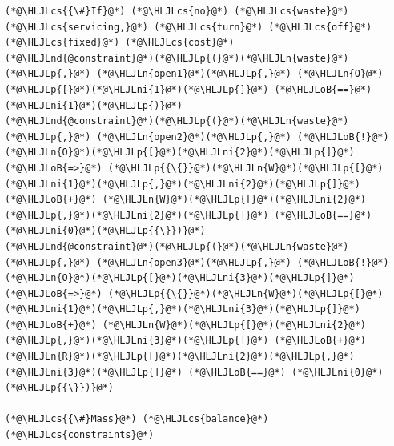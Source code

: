 \documentclass[12pt,a4paper]{article}
\newcommand{\HLJLn}[1]{#1}
\newcommand{\HLJLnd}[1]{\textcolor[RGB]{214,102,97}{#1}}
\newcommand{\HLJLni}[1]{\textcolor[RGB]{59,151,46}{#1}}
\newcommand{\HLJLoB}[1]{\textcolor[RGB]{102,102,102}{\textbf{#1}}}
\newcommand{\HLJLp}[1]{#1}
\newcommand{\HLJLcs}[1]{\textcolor[RGB]{153,153,119}{\textit{#1}}}
\begin{document}
\begin{lstlisting}
(*@\HLJLcs{{\#}If}@*) (*@\HLJLcs{no}@*) (*@\HLJLcs{waste}@*) (*@\HLJLcs{servicing,}@*) (*@\HLJLcs{turn}@*) (*@\HLJLcs{off}@*) (*@\HLJLcs{fixed}@*) (*@\HLJLcs{cost}@*)
(*@\HLJLnd{@constraint}@*)(*@\HLJLp{(}@*)(*@\HLJLn{waste}@*)(*@\HLJLp{,}@*) (*@\HLJLn{open1}@*)(*@\HLJLp{,}@*) (*@\HLJLn{O}@*)(*@\HLJLp{[}@*)(*@\HLJLni{1}@*)(*@\HLJLp{]}@*) (*@\HLJLoB{==}@*) (*@\HLJLni{1}@*)(*@\HLJLp{)}@*)
(*@\HLJLnd{@constraint}@*)(*@\HLJLp{(}@*)(*@\HLJLn{waste}@*)(*@\HLJLp{,}@*) (*@\HLJLn{open2}@*)(*@\HLJLp{,}@*) (*@\HLJLoB{!}@*)(*@\HLJLn{O}@*)(*@\HLJLp{[}@*)(*@\HLJLni{2}@*)(*@\HLJLp{]}@*) (*@\HLJLoB{=>}@*) (*@\HLJLp{{\{}}@*)(*@\HLJLn{W}@*)(*@\HLJLp{[}@*)(*@\HLJLni{1}@*)(*@\HLJLp{,}@*)(*@\HLJLni{2}@*)(*@\HLJLp{]}@*) (*@\HLJLoB{+}@*) (*@\HLJLn{W}@*)(*@\HLJLp{[}@*)(*@\HLJLni{2}@*)(*@\HLJLp{,}@*)(*@\HLJLni{2}@*)(*@\HLJLp{]}@*) (*@\HLJLoB{==}@*) (*@\HLJLni{0}@*)(*@\HLJLp{{\}})}@*)
(*@\HLJLnd{@constraint}@*)(*@\HLJLp{(}@*)(*@\HLJLn{waste}@*)(*@\HLJLp{,}@*) (*@\HLJLn{open3}@*)(*@\HLJLp{,}@*) (*@\HLJLoB{!}@*)(*@\HLJLn{O}@*)(*@\HLJLp{[}@*)(*@\HLJLni{3}@*)(*@\HLJLp{]}@*) (*@\HLJLoB{=>}@*) (*@\HLJLp{{\{}}@*)(*@\HLJLn{W}@*)(*@\HLJLp{[}@*)(*@\HLJLni{1}@*)(*@\HLJLp{,}@*)(*@\HLJLni{3}@*)(*@\HLJLp{]}@*) (*@\HLJLoB{+}@*) (*@\HLJLn{W}@*)(*@\HLJLp{[}@*)(*@\HLJLni{2}@*)(*@\HLJLp{,}@*)(*@\HLJLni{3}@*)(*@\HLJLp{]}@*) (*@\HLJLoB{+}@*) (*@\HLJLn{R}@*)(*@\HLJLp{[}@*)(*@\HLJLni{2}@*)(*@\HLJLp{,}@*)(*@\HLJLni{3}@*)(*@\HLJLp{]}@*) (*@\HLJLoB{==}@*) (*@\HLJLni{0}@*)(*@\HLJLp{{\}})}@*)

(*@\HLJLcs{{\#}Mass}@*) (*@\HLJLcs{balance}@*) (*@\HLJLcs{constraints}@*)


\end{lstlisting}
\end{document}
